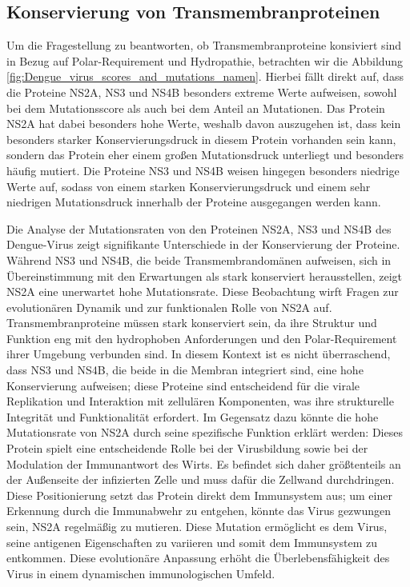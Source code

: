 \documentclass[german,version-2022-01]{uzl-thesis}
\begin{document}
\subsection{Konservierung von Transmembranproteinen}
Um die Fragestellung zu beantworten, ob Transmembranproteine konsiviert sind in Bezug auf Polar-Requirement und Hydropathie, betrachten wir die Abbildung \ref{fig:Dengue_virus_scores_and_mutations_namen}. Hierbei f\"allt direkt auf, dass die Proteine NS2A, NS3 und NS4B besonders extreme Werte aufweisen, sowohl bei dem Mutationsscore als auch bei dem Anteil an Mutationen. Das Protein NS2A hat dabei besonders hohe Werte, weshalb davon auszugehen ist, dass kein besonders starker Konservierungsdruck in diesem Protein vorhanden sein kann, sondern das Protein eher einem gro\ss{}en Mutationsdruck unterliegt und besonders h\"aufig mutiert. Die Proteine NS3 und NS4B weisen hingegen besonders niedrige Werte auf, sodass von einem starken Konservierungsdruck und einem sehr niedrigen Mutationsdruck innerhalb der Proteine ausgegangen werden kann. 

Die Analyse der Mutationsraten von den Proteinen NS2A, NS3 und NS4B des Dengue-Virus zeigt signifikante Unterschiede in der Konservierung der Proteine. W\"ahrend NS3 und NS4B, die beide Transmembrandom\"anen aufweisen, sich in \"Ubereinstimmung mit den Erwartungen als stark konserviert herausstellen, zeigt NS2A eine unerwartet hohe Mutationsrate. Diese Beobachtung wirft Fragen zur evolution\"aren Dynamik und zur funktionalen Rolle von NS2A auf. Transmembranproteine m\"ussen stark konserviert sein, da ihre Struktur und Funktion eng mit den hydrophoben Anforderungen und den Polar-Requirement ihrer Umgebung verbunden sind. In diesem Kontext ist es nicht \"uberraschend, dass NS3 und NS4B, die beide in die Membran integriert sind, eine hohe Konservierung aufweisen; diese Proteine sind entscheidend f\"ur die virale Replikation und Interaktion mit zellul\"aren Komponenten, was ihre strukturelle Integrit\"at und Funktionalit\"at erfordert. Im Gegensatz dazu k\"onnte die hohe Mutationsrate von NS2A durch seine spezifische Funktion erkl\"art werden: Dieses Protein spielt eine entscheidende Rolle bei der Virusbildung sowie bei der Modulation der Immunantwort des Wirts. Es befindet sich daher gr\"o\ss{}tenteils an der Au\ss{}enseite der infizierten Zelle und muss daf\"ur die Zellwand durchdringen. Diese Positionierung setzt das Protein direkt dem Immunsystem aus; um einer Erkennung durch die Immunabwehr zu entgehen, k\"onnte das Virus gezwungen sein, NS2A regelm\"a\ss{}ig zu mutieren. Diese Mutation erm\"oglicht es dem Virus, seine antigenen Eigenschaften zu variieren und somit dem Immunsystem zu entkommen. Diese evolution\"are Anpassung erh\"oht die \"Uberlebensf\"ahigkeit des Virus in einem dynamischen immunologischen Umfeld.
\end{document}
